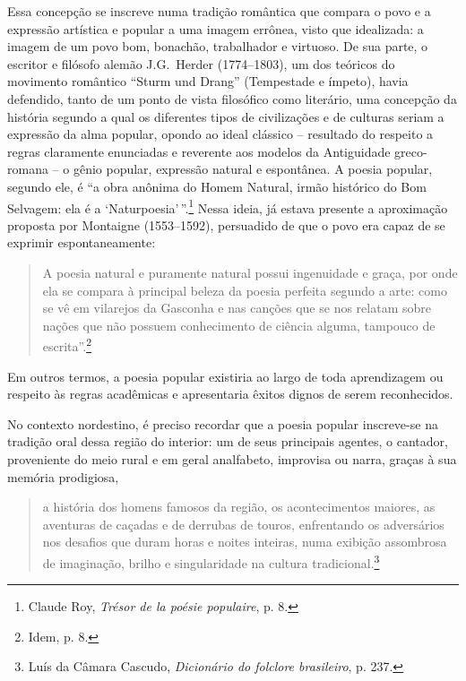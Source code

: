 \noindent Essa concepção se inscreve numa
tradição romântica que compara o povo e a expressão artística e popular a uma
imagem errônea, visto que idealizada: a imagem de um povo bom, bonachão,
trabalhador e virtuoso. De sua parte, o escritor e filósofo alemão J.G.~Herder
(1774--1803), um dos teóricos do movimento romântico ``Sturm und Drang'' (Tempestade e ímpeto), havia
defendido, tanto de um ponto de vista filosófico como literário, uma concepção
da história segundo a qual os diferentes tipos de civilizações e de culturas
seriam a expressão da alma popular, opondo ao ideal clássico -- resultado do
respeito a regras claramente enunciadas e reverente aos modelos da Antiguidade
greco-romana -- o gênio popular, expressão natural e espontânea. A poesia
popular, segundo ele, é “a obra anônima do Homem Natural, irmão histórico do Bom
Selvagem: ela é a ‘Naturpoesia’\,”.\footnote{ Claude Roy, \textit{Trésor de la
poésie populaire}, p. 8.} Nessa ideia, já estava presente a aproximação
proposta por Montaigne (1553--1592), persuadido de que o povo era capaz de se
exprimir espontaneamente:

\begin{quote}
A poesia natural e puramente natural possui
ingenuidade e graça, por onde ela se compara à principal beleza da poesia
perfeita segundo a arte: como se vê em vilarejos da Gasconha e nas canções que
se nos relatam sobre nações que não possuem conhecimento de ciência alguma,
tampouco de escrita”.\footnote{ Idem, p. 8.}
\end{quote}

Em outros termos, a poesia popular existiria ao largo de toda aprendizagem ou
respeito às regras acadêmicas e apresentaria êxitos dignos de serem
reconhecidos.

No contexto nordestino, é preciso recordar que a poesia popular inscreve-se na
tradição oral dessa região do interior: um de seus principais agentes, o
cantador, proveniente do meio rural e em geral analfabeto, improvisa ou narra,
graças à sua memória prodigiosa, 

\begin{quote}
a história dos homens famosos da região, os
acontecimentos maiores, as aventuras de caçadas e de derrubas de touros,
enfrentando os adversários nos desafios que duram horas e noites inteiras, numa
exibição assombrosa de imaginação, brilho e singularidade na cultura
tradicional.\footnote{ Luís da Câmara Cascudo, \textit{Dicionário do folclore
brasileiro}, p. 237.}
\end{quote}

